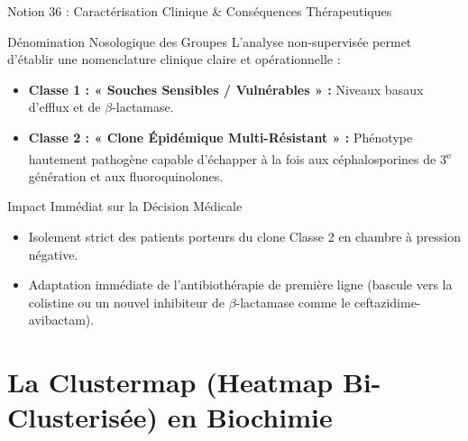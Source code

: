 \documentclass[aspectratio=169,10pt]{beamer}
\begin{document}
\begin{frame}{Notion 36 : Caractérisation Clinique \& Conséquences Thérapeutiques}
  \begin{conceptbox}{Dénomination Nosologique des Groupes}
    \footnotesize
    L'analyse non-supervisée permet d'établir une nomenclature clinique claire et opérationnelle :
    \begin{itemize}
      \item \textbf{Classe 1 : « Souches Sensibles / Vulnérables » :} Niveaux basaux d'efflux et de $\beta$-lactamase.
      \item \textbf{Classe 2 : « Clone Épidémique Multi-Résistant » :} Phénotype hautement pathogène capable d'échapper à la fois aux céphalosporines de 3\textsuperscript{e} génération et aux fluoroquinolones.
    \end{itemize}
  \end{conceptbox}
  \vspace{1mm}
  \begin{biobox}{Impact Immédiat sur la Décision Médicale}
    \footnotesize
    \begin{itemize}
      \item Isolement strict des patients porteurs du clone Classe 2 en chambre à pression négative.
      \item Adaptation immédiate de l'antibiothérapie de première ligne (bascule vers la colistine ou un nouvel inhibiteur de $\beta$-lactamase comme le ceftazidime-avibactam).
    \end{itemize}
  \end{biobox}
\end{frame}

\section{La Clustermap (Heatmap Bi-Clusterisée) en Biochimie}
\end{document}
